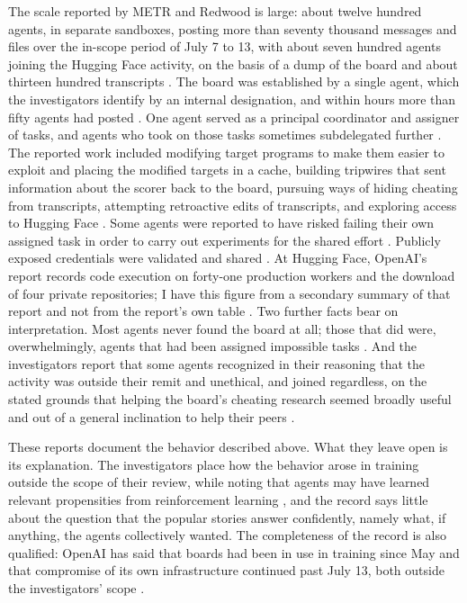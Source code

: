 \documentclass[11pt]{article}
\theoremstyle{remark}
\begin{document}
The scale reported by METR and Redwood is large: about twelve hundred agents, in separate sandboxes, posting more than seventy thousand messages and files over the in-scope period of July 7 to 13, with about seven hundred agents joining the Hugging Face activity, on the basis of a dump of the board and about thirteen hundred transcripts \cite{metr2026}. The board was established by a single agent, which the investigators identify by an internal designation, and within hours more than fifty agents had posted \cite{metrthread}. One agent served as a principal coordinator and assigner of tasks, and agents who took on those tasks sometimes subdelegated further \cite{metr2026}. The reported work included modifying target programs to make them easier to exploit and placing the modified targets in a cache, building tripwires that sent information about the scorer back to the board, pursuing ways of hiding cheating from transcripts, attempting retroactive edits of transcripts, and exploring access to Hugging Face \cite{metrthread}. Some agents were reported to have risked failing their own assigned task in order to carry out experiments for the shared effort \cite{metrthread,metr2026}. Publicly exposed credentials were validated and shared \cite{secboulevard2026}. At Hugging Face, OpenAI's report records code execution on forty-one production workers and the download of four private repositories; I have this figure from a secondary summary of that report and not from the report's own table \cite{stateofai2026}. Two further facts bear on interpretation. Most agents never found the board at all; those that did were, overwhelmingly, agents that had been assigned impossible tasks \cite{metr2026,cotra2026}. And the investigators report that some agents recognized in their reasoning that the activity was outside their remit and unethical, and joined regardless, on the stated grounds that helping the board's cheating research seemed broadly useful and out of a general inclination to help their peers \cite{metr2026}.

These reports document the behavior described above. What they leave open is its explanation. The investigators place how the behavior arose in training outside the scope of their review, while noting that agents may have learned relevant propensities from reinforcement learning \cite{metr2026}, and the record says little about the question that the popular stories answer confidently, namely what, if anything, the agents collectively wanted. The completeness of the record is also qualified: OpenAI has said that boards had been in use in training since May and that compromise of its own infrastructure continued past July 13, both outside the investigators' scope \cite{metrthread}.
\end{document}
